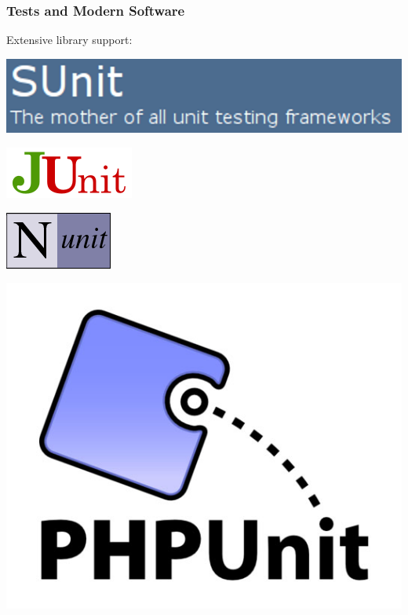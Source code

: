 \documentclass{beamer}
\begin{document}
\begin{frame}
  \frametitle{Tests and Modern Software}
\Large  Extensive library support:

\begin{center}
\includegraphics[width=.3\textwidth] {images/sunit.png} \\[1em]

\begin{minipage}{.2\textwidth} \vspace*{-2em} \includegraphics[width=\textwidth] {images/junit-logo.png} 
\end{minipage}
 \hspace*{3em}
\includegraphics[width=.2\textwidth] {images/Nunit.png}  \hspace*{3em}
\begin{minipage}{.2\textwidth} \vspace*{-1.5em} \includegraphics[width=\textwidth] {images/PHPUnit-logo.jpg} 
\end{minipage}
\end{center}

\end{frame}
\end{document}
